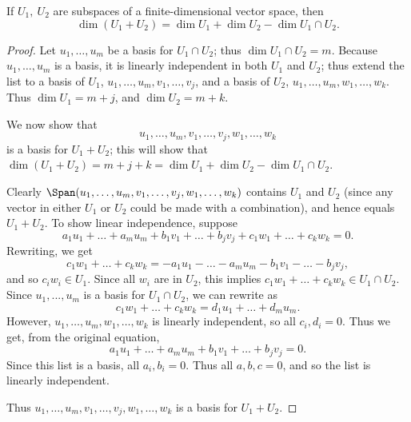 \documentclass[math0540-lecture-notes.tex]{subfiles}
\begin{document}
\begin{proposition}{}
  If $U_1,\ U_2$ are subspaces of a finite-dimensional vector space, then \[
    \dim(U_1+U_2)=\dim U_1 + \dim U_2 - \dim{U_1\cap U_2}
  .\] 
\end{proposition}
\begin{proof}[Proof]
  Let $ u_1,\ldots,u_m$ be a basis for $U_1\cap U_2$; thus $\dim{U_1\cap U_2} =m$. Because
  $u_1,\ldots,u_m$ is a basis, it is linearly independent in both $U_1$ and $U_2$; thus extend the
  list to a basis of $U_1$, $ u_1,\ldots,u_m,v_1,\ldots,v_j$, and a basis of $U_2$,
  $u_1,\ldots,u_m,w_1,\ldots,w_k$. Thus $ \dim U_1=m+j$, and $\dim U_2=m+k$.

  We now show that \[
    u_1,\ldots,u_m,v_1,\ldots,v_j,w_1,\ldots,w_k
  \] is a basis for $U_1+U_2$; this will show that $\dim(U_1+U_2)=m+j+k=\dim U_1+\dim
  U_2-\dim{U_1\cap U_2}$.

  Clearly $\Span(u_1,\ldots,u_m,v_1,\ldots,v_j,w_1,\ldots,w_k)$ contains $ U_1$ and $ U_2$ (since
  any vector in either $ U_1$ or $U_2$ could be made with a combination), and hence equals
  $U_1+U_2$. To show linear independence, suppose \[
    a_1u_1+\ldots+a_mu_m+b_1v_1+\ldots+b_jv_j+c_1w_1+\ldots+c_kw_k=0
  .\] Rewriting, we get \[
    c_1w_1+\ldots+c_kw_k=-a_1u_1-\ldots-a_mu_m-b_1v_1-\ldots-b_jv_j
  ,\] and so $ c_iw_i\in U_1$. Since all $w_i$ are in $U_2$, this implies $c_1w_1+\ldots+c_kw_k\in
  U_1\cap U_2$. Since $  u_1,...,u_m$ is a basis for $U_1\cap U_2$, we can rewrite as \[
    c_1w_1+\ldots+c_kw_k=d_1u_1+\ldots+d_mu_m
  .\] However, $u_1,\ldots,u_m,w_1,\ldots,w_k$ is linearly independent, so all $c_i,d_i=0$. Thus we
  get, from the original equation, \[
    a_1u_1+\ldots+a_mu_m+b_1v_1+\ldots+b_jv_j=0
  .\] Since this list is a basis, all $a_i,b_i=0$. Thus all $a,b,c=0$, and so the list is linearly
  independent.

  Thus $ u_1,\ldots,u_m,v_1,\ldots,v_j,w_1,\ldots,w_k$ is a basis for $U_1+U_2$.
\end{proof}





















  
\end{document}
